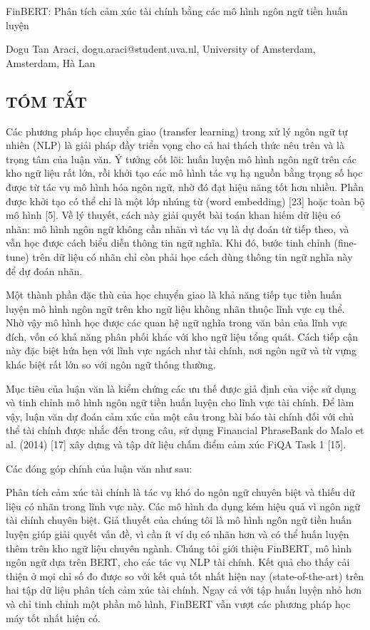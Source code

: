 FinBERT: Phân tích cảm xúc tài chính bằng các mô hình ngôn ngữ tiền huấn luyện

Dogu Tan Araci, dogu.araci@student.uva.nl, University of Amsterdam, Amsterdam, Hà Lan

\subsection{TÓM TẮT}

Các phương pháp học chuyển giao (transfer learning) trong xử lý ngôn ngữ tự nhiên (NLP) là giải pháp đầy triển vọng cho cả hai thách thức nêu trên và là trọng tâm của luận văn. Ý tưởng cốt lõi: huấn luyện mô hình ngôn ngữ trên các kho ngữ liệu rất lớn, rồi khởi tạo các mô hình tác vụ hạ nguồn bằng trọng số học được từ tác vụ mô hình hóa ngôn ngữ, nhờ đó đạt hiệu năng tốt hơn nhiều. Phần được khởi tạo có thể chỉ là một lớp nhúng từ (word embedding) {[}23{]} hoặc toàn bộ mô hình {[}5{]}. Về lý thuyết, cách này giải quyết bài toán khan hiếm dữ liệu có nhãn: mô hình ngôn ngữ không cần nhãn vì tác vụ là dự đoán từ tiếp theo, và vẫn học được cách biểu diễn thông tin ngữ nghĩa. Khi đó, bước tinh chỉnh (fine-tune) trên dữ liệu có nhãn chỉ còn phải học cách dùng thông tin ngữ nghĩa này để dự đoán nhãn.

Một thành phần đặc thù của học chuyển giao là khả năng tiếp tục tiền huấn luyện mô hình ngôn ngữ trên kho ngữ liệu không nhãn thuộc lĩnh vực cụ thể. Nhờ vậy mô hình học được các quan hệ ngữ nghĩa trong văn bản của lĩnh vực đích, vốn có khả năng phân phối khác với kho ngữ liệu tổng quát. Cách tiếp cận này đặc biệt hứa hẹn với lĩnh vực ngách như tài chính, nơi ngôn ngữ và từ vựng khác biệt rất lớn so với ngôn ngữ thông thường.

Mục tiêu của luận văn là kiểm chứng các ưu thế được giả định của việc sử dụng và tinh chỉnh mô hình ngôn ngữ tiền huấn luyện cho lĩnh vực tài chính. Để làm vậy, luận văn dự đoán cảm xúc của một câu trong bài báo tài chính đối với chủ thể tài chính được nhắc đến trong câu, sử dụng Financial PhraseBank do Malo et al. (2014) {[}17{]} xây dựng và tập dữ liệu chấm điểm cảm xúc FiQA Task 1 {[}15{]}.

Các đóng góp chính của luận văn như sau:

Phân tích cảm xúc tài chính là tác vụ khó do ngôn ngữ chuyên biệt và thiếu dữ liệu có nhãn trong lĩnh vực này. Các mô hình đa dụng kém hiệu quả vì ngôn ngữ tài chính chuyên biệt. Giả thuyết của chúng tôi là mô hình ngôn ngữ tiền huấn luyện giúp giải quyết vấn đề, vì cần ít ví dụ có nhãn hơn và có thể huấn luyện thêm trên kho ngữ liệu chuyên ngành. Chúng tôi giới thiệu FinBERT, mô hình ngôn ngữ dựa trên BERT, cho các tác vụ NLP tài chính. Kết quả cho thấy cải thiện ở mọi chỉ số đo được so với kết quả tốt nhất hiện nay (state-of-the-art) trên hai tập dữ liệu phân tích cảm xúc tài chính. Ngay cả với tập huấn luyện nhỏ hơn và chỉ tinh chỉnh một phần mô hình, FinBERT vẫn vượt các phương pháp học máy tốt nhất hiện có.

